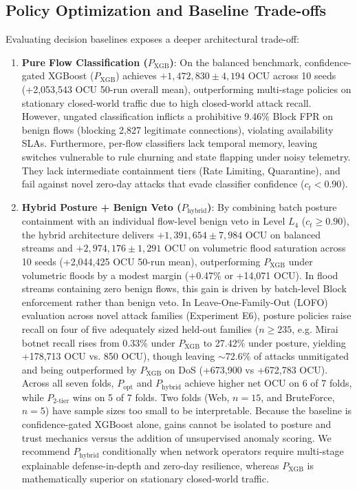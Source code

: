\documentclass[journal,10pt,onecolumn]{IEEEtran}
\begin{document}
\subsection{Policy Optimization and Baseline Trade-offs}
Evaluating decision baselines exposes a deeper architectural trade-off:
\begin{enumerate}
    \item \textbf{Pure Flow Classification ($P_{\text{XGB}}$)}: On the balanced benchmark, confidence-gated XGBoost ($P_{\text{XGB}}$) achieves $+1,472,830 \pm 4,194$ OCU across 10 seeds (+2,053,543 OCU 50-run overall mean), outperforming multi-stage policies on stationary closed-world traffic due to high closed-world attack recall. However, ungated classification inflicts a prohibitive 9.46\% Block FPR on benign flows (blocking 2,827 legitimate connections), violating availability SLAs. Furthermore, per-flow classifiers lack temporal memory, leaving switches vulnerable to rule churning and state flapping under noisy telemetry. They lack intermediate containment tiers (Rate Limiting, Quarantine), and fail against novel zero-day attacks that evade classifier confidence ($c_t < 0.90$).
    \item \textbf{Hybrid Posture + Benign Veto ($P_{\text{hybrid}}$)}: By combining batch posture containment with an individual flow-level benign veto in Level $L_4$ ($c_t \ge 0.90$), the hybrid architecture delivers $+1,391,654 \pm 7,984$ OCU on balanced streams and $+2,974,176 \pm 1,291$ OCU on volumetric flood saturation across 10 seeds (+2,044,425 OCU 50-run mean), outperforming $P_{\text{XGB}}$ under volumetric floods by a modest margin (+0.47\% or +14,071 OCU). In flood streams containing zero benign flows, this gain is driven by batch-level Block enforcement rather than benign veto. In Leave-One-Family-Out (LOFO) evaluation across novel attack families (Experiment E6), posture policies raise recall on four of five adequately sized held-out families ($n \ge 235$, e.g. Mirai botnet recall rises from 0.33\% under $P_{\text{XGB}}$ to 27.42\% under posture, yielding +178,713 OCU vs. 850 OCU), though leaving $\sim$72.6\% of attacks unmitigated and being outperformed by $P_{\text{XGB}}$ on DoS (+673,900 vs +672,783 OCU). Across all seven folds, $P_{\text{opt}}$ and $P_{\text{hybrid}}$ achieve higher net OCU on 6 of 7 folds, while $P_{2\text{-tier}}$ wins on 5 of 7 folds. Two folds (Web, $n=15$, and BruteForce, $n=5$) have sample sizes too small to be interpretable. Because the baseline is confidence-gated XGBoost alone, gains cannot be isolated to posture and trust mechanics versus the addition of unsupervised anomaly scoring. We recommend $P_{\text{hybrid}}$ conditionally when network operators require multi-stage explainable defense-in-depth and zero-day resilience, whereas $P_{\text{XGB}}$ is mathematically superior on stationary closed-world traffic.
\end{enumerate}
\end{document}
